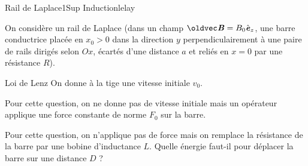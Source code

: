 \begin{exercise}{Rail de Laplace}{1}{Sup}
{Induction}{lelay}

On considère un rail de Laplace (dans un champ $\vec{B} = B_0\ve_z$, une barre conductrice placée en $x_0 > 0$ dans la direction $y$ perpendiculairement à une paire de rails dirigés selon $Ox$, écartés d'une distance $a$ et reliés en $x = 0$ par une résistance $R$).

\begin{questions}
    \questioncours Loi de Lenz
    \question On donne à la tige une vitesse initiale $v_0$. 
    \question Pour cette question, on ne donne pas de vitesse initiale mais un opérateur applique une force constante de norme $F_0$ sur la barre.
    \question Pour cette question, on n'applique pas de force mais on remplace la résistance de la barre par une bobine d'inductance $L$. Quelle énergie faut-il pour déplacer la barre sur une distance $D$ ?
\end{questions}

\end{exercise}
